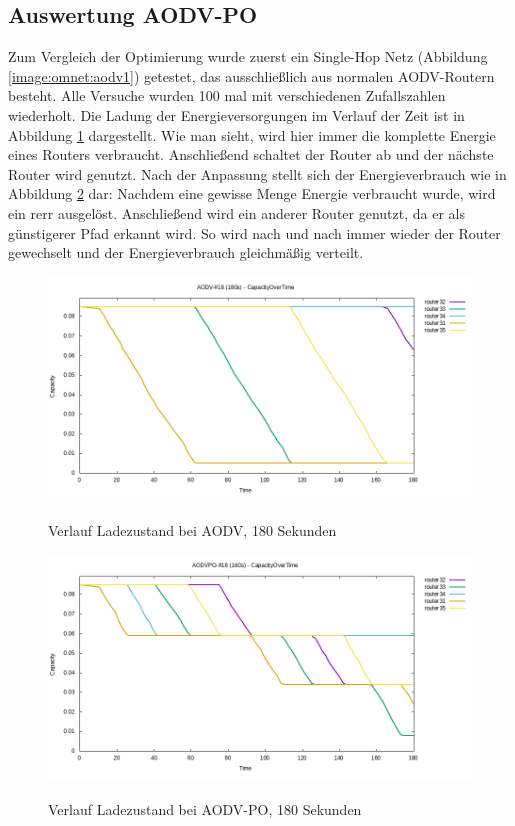 \subsection{Auswertung AODV-PO}
\label{chapter:auswertung:versuche-aodv}

Zum Vergleich der Optimierung wurde zuerst ein Single-Hop Netz (\vgl Abbildung \ref{image:omnet:aodv1}) getestet, das ausschließlich aus normalen AODV-Routern besteht. Alle Versuche wurden 100 mal mit verschiedenen Zufallszahlen wiederholt. Die Ladung der Energieversorgungen im Verlauf der Zeit ist in Abbildung   \ref{image:omnet:olsr:av1} dargestellt. Wie man sieht, wird hier immer die komplette Energie eines Routers verbraucht. Anschließend schaltet der Router ab und der nächste Router wird genutzt. Nach der Anpassung stellt sich der Energieverbrauch wie in Abbildung \ref{image:omnet:olsr:av5} dar: Nachdem eine gewisse Menge Energie verbraucht wurde, wird ein \gls{rerr} ausgelöst. Anschließend wird ein anderer Router genutzt, da er als günstigerer Pfad erkannt wird. So wird nach und nach immer wieder der Router gewechselt und der Energieverbrauch gleichmäßig verteilt.\newline

\begin{figure}
  \centering
  \includegraphics[scale=0.55]{bilder/av1.png} \\
  \caption{Verlauf Ladezustand bei AODV, 180 Sekunden}
  \label{image:omnet:olsr:av1}
\end{figure}

\begin{figure}
  \centering
  \includegraphics[scale=0.55]{bilder/av5.png} \\
  \caption{Verlauf Ladezustand bei AODV-PO, 180 Sekunden}
  \label{image:omnet:olsr:av5}
\end{figure}


